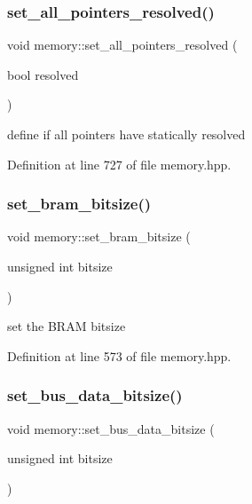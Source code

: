 \subsubsection{\texorpdfstring{set\+\_\+all\+\_\+pointers\+\_\+resolved()}{set\_all\_pointers\_resolved()}}
{\footnotesize\ttfamily void memory\+::set\+\_\+all\+\_\+pointers\+\_\+resolved (\begin{DoxyParamCaption}\item[{bool}]{resolved }\end{DoxyParamCaption})\hspace{0.3cm}{\ttfamily [inline]}}



define if all pointers have statically resolved 



Definition at line 727 of file memory.\+hpp.

\mbox{\label{classmemory_a7d924bbfab481c80b2770c59f2824b35}} 
\subsubsection{\texorpdfstring{set\+\_\+bram\+\_\+bitsize()}{set\_bram\_bitsize()}}
{\footnotesize\ttfamily void memory\+::set\+\_\+bram\+\_\+bitsize (\begin{DoxyParamCaption}\item[{unsigned int}]{bitsize }\end{DoxyParamCaption})\hspace{0.3cm}{\ttfamily [inline]}}



set the B\+R\+AM bitsize 



Definition at line 573 of file memory.\+hpp.

\mbox{\label{classmemory_a2bfe7650482db62c431267c6cb01ccac}} 
\subsubsection{\texorpdfstring{set\+\_\+bus\+\_\+data\+\_\+bitsize()}{set\_bus\_data\_bitsize()}}
{\footnotesize\ttfamily void memory\+::set\+\_\+bus\+\_\+data\+\_\+bitsize (\begin{DoxyParamCaption}\item[{unsigned int}]{bitsize }\end{DoxyParamCaption})\hspace{0.3cm}{\ttfamily [inline]}}



